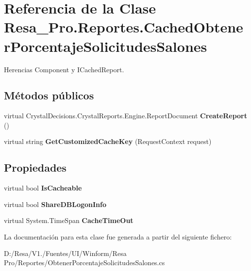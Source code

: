 \section{Referencia de la Clase Resa\+\_\+\+Pro.\+Reportes.\+Cached\+Obtener\+Porcentaje\+Solicitudes\+Salones}
\label{class_resa___pro_1_1_reportes_1_1_cached_obtener_porcentaje_solicitudes_salones}


Herencias Component y I\+Cached\+Report.

\subsection*{Métodos públicos}
\begin{DoxyCompactItemize}
\item 
virtual Crystal\+Decisions.\+Crystal\+Reports.\+Engine.\+Report\+Document {\bfseries Create\+Report} ()\label{class_resa___pro_1_1_reportes_1_1_cached_obtener_porcentaje_solicitudes_salones_a1f4d3aa04fc0bf9e903499785a15b1aa}

\item 
virtual string {\bfseries Get\+Customized\+Cache\+Key} (Request\+Context request)\label{class_resa___pro_1_1_reportes_1_1_cached_obtener_porcentaje_solicitudes_salones_a75cf0dcc4e44184f683ad662800b7aa2}

\end{DoxyCompactItemize}
\subsection*{Propiedades}
\begin{DoxyCompactItemize}
\item 
virtual bool {\bfseries Is\+Cacheable}\hspace{0.3cm}{\ttfamily  [get, set]}\label{class_resa___pro_1_1_reportes_1_1_cached_obtener_porcentaje_solicitudes_salones_a300df1d02f93cb471f0926b3be36f004}

\item 
virtual bool {\bfseries Share\+D\+B\+Logon\+Info}\hspace{0.3cm}{\ttfamily  [get, set]}\label{class_resa___pro_1_1_reportes_1_1_cached_obtener_porcentaje_solicitudes_salones_a39959ce6db232318f2541ec420348b2a}

\item 
virtual System.\+Time\+Span {\bfseries Cache\+Time\+Out}\hspace{0.3cm}{\ttfamily  [get, set]}\label{class_resa___pro_1_1_reportes_1_1_cached_obtener_porcentaje_solicitudes_salones_a20da56cf85a1ccc8f3617011b6f41b26}

\end{DoxyCompactItemize}


La documentación para esta clase fue generada a partir del siguiente fichero\+:\begin{DoxyCompactItemize}
\item 
D\+:/\+Resa/\+V1./\+Fuentes/\+U\+I/\+Winform/\+Resa Pro/\+Reportes/Obtener\+Porcentaje\+Solicitudes\+Salones.\+cs\end{DoxyCompactItemize}
